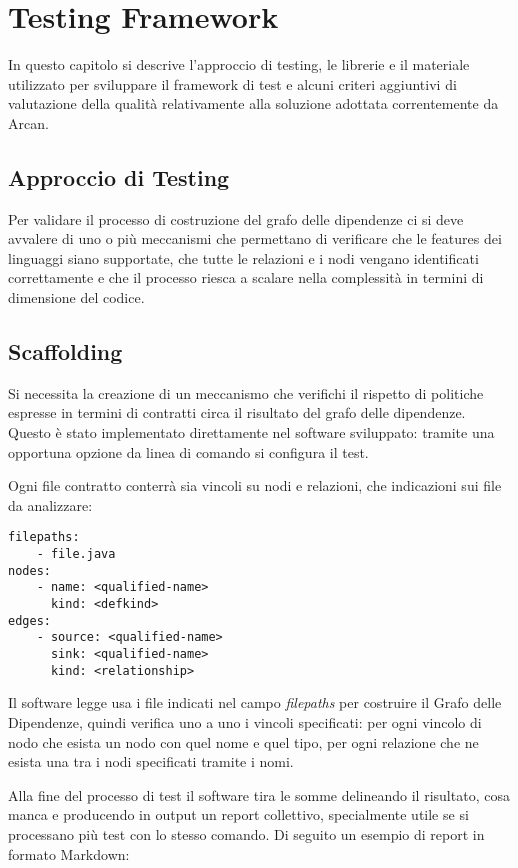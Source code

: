 \chapter{Testing Framework}

In questo capitolo si descrive l'approccio di testing, le librerie e il materiale utilizzato per sviluppare il framework di test e alcuni criteri aggiuntivi di valutazione della qualit\`a relativamente alla soluzione adottata correntemente da Arcan.

\section{Approccio di Testing}

Per validare il processo di costruzione del grafo delle dipendenze ci si deve avvalere di uno o pi\`u meccanismi che permettano di verificare che le features dei linguaggi siano supportate, che tutte le relazioni e i nodi vengano identificati correttamente e che il processo riesca a scalare nella complessit\`a in termini di dimensione del codice.

\section{Scaffolding}

Si necessita la creazione di un meccanismo che verifichi il rispetto di politiche espresse in termini di contratti circa il risultato del grafo delle dipendenze. Questo \`e stato implementato direttamente nel software sviluppato: tramite una opportuna opzione da linea di comando si configura il test.

Ogni file contratto conterr\`a sia vincoli su nodi e relazioni, che indicazioni sui file da analizzare:

\begin{lstlisting}
filepaths:
    - file.java
nodes:
    - name: <qualified-name>
      kind: <defkind>
edges:
    - source: <qualified-name>
      sink: <qualified-name>
      kind: <relationship>
\end{lstlisting}

Il software legge usa i file indicati nel campo \emph{filepaths} per costruire il Grafo delle Dipendenze, quindi verifica uno a uno i vincoli specificati: per ogni vincolo di nodo che esista un nodo con quel nome e quel tipo, per ogni relazione che ne esista una tra i nodi specificati tramite i nomi.

Alla fine del processo di test il software tira le somme delineando il risultato, cosa manca e producendo in output un report collettivo, specialmente utile se si processano pi\`u test con lo stesso comando. Di seguito un esempio di report in formato Markdown:

